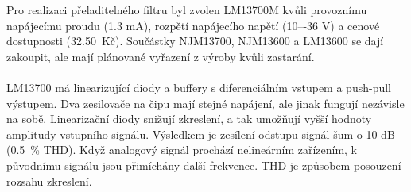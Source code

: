 \begin{center}
\begin{table}[h]
  \caption[Porovnání integrovaných obvodů se dvěma OTA]{\label{tab:Porovnání IC se dvěma OTA}Porovnání IC se dvěma OTA \cite{18}}
  \end{table}
\end{center}
\noindent Pro realizaci přeladitelného filtru byl zvolen LM13700M kvůli provoznímu napájecímu proudu (1.3 mA), rozpětí napájecího napětí (10–-36 V) a cenové dostupnosti (32.50\ Kč). Součástky NJM13700, NJM13600 a LM13600 se dají zakoupit, ale mají plánované vyřazení z výroby kvůli zastarání. \\
\\
LM13700 má linearizující diody a buffery s diferenciálním vstupem a push-pull výstupem. Dva zesilovače na čipu mají stejné napájení, ale jinak fungují nezávisle na sobě. Linearizační diody snižují zkreslení, a tak umožňují vyšší hodnoty amplitudy vstupního signálu. Výsledkem je zesílení odstupu signál-šum o 10 dB (0.5~\% THD). Když analogový signál prochází nelineárním zařízením, k původnímu signálu jsou přimíchány další frekvence. THD je způsobem posouzení rozsahu zkreslení.\\
